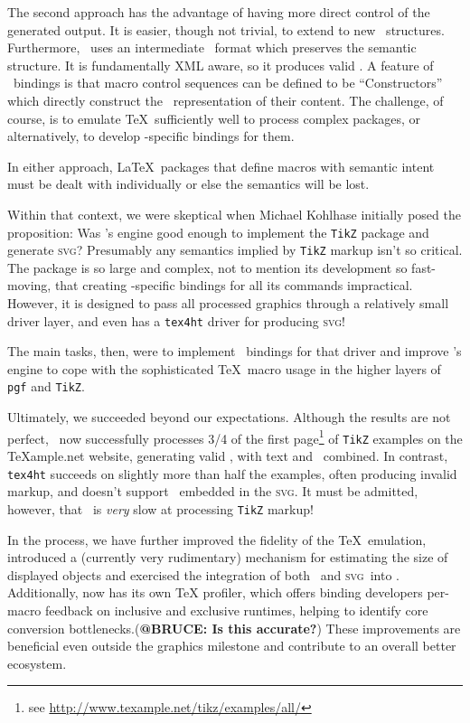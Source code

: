 \documentclass{llncs}
\def\svg{\textsc{svg}\xspace}
\def\tikz{\texttt{TikZ}\xspace}
\begin{document}
The second approach has the advantage of having more
direct control of the generated output.
It is easier, though not trivial, to extend to new
\XML\ structures.  Furthermore, \LaTeXML\
uses an intermediate \XML\ format which preserves
the semantic structure. It is fundamentally XML aware, so it produces valid \XML.
A feature of \LaTeXML\ bindings is that macro
control sequences can be defined to be ``Constructors''
which directly construct the \XML\ representation
of their content.
The challenge, of course, is to emulate \TeX\ sufficiently well to
process complex packages, or alternatively, to
develop \LaTeXML-specific bindings for them.

In either approach, \LaTeX\ packages that define
macros with semantic intent must be dealt with
individually or else the semantics will be lost.

Within that context, we were skeptical when Michael Kohlhase
initially posed the proposition: Was \LaTeXML's engine good
enough to implement the \tikz package and generate \svg?
Presumably any semantics implied by \tikz markup isn't so critical.
The package is so large and complex, not to mention
its development so fast-moving, that creating \LaTeXML-specific
bindings for all its commands impractical.  However,
it is designed to pass all processed graphics through
a relatively small driver layer, and even has a \texttt{tex4ht} driver for producing \svg!

The main tasks, then, were to implement \LaTeXML\ bindings
for that driver and improve \LaTeXML's engine to cope
with the sophisticated \TeX\ macro usage in the higher
layers of \texttt{pgf} and \tikz.

Ultimately, we succeeded beyond our expectations.
Although the results are not perfect,
\LaTeXML\ now successfully processes 3/4 of the
first page\footnote{see \url{http://www.texample.net/tikz/examples/all/}} of \tikz examples on the
{\TeX}ample.net website, generating valid
, with text and \MathML\ combined.
In contrast, \texttt{tex4ht} succeeds on slightly more
than half the examples, often producing invalid markup,
and doesn't support \MathML\ embedded in the \svg.
It must be admitted, however, that \LaTeXML\ is \emph{very}
slow at processing \tikz markup!

In the process, we have further improved the
fidelity of the \TeX\ emulation, introduced
a (currently very rudimentary) mechanism for estimating
the size of displayed objects and exercised the
integration of both \MathML\ and \svg\ into \HTML. 
Additionally, {\LaTeXML} now has its own {\TeX} profiler, which
offers binding developers per-macro feedback on
inclusive and exclusive runtimes, helping to identify core conversion bottlenecks.(\textbf{@BRUCE: Is this accurate?})
These improvements are beneficial even outside the graphics milestone and
contribute to an overall better {\LaTeXML} ecosystem.
\end{document}
